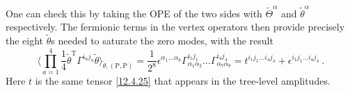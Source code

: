\noindent One can check this by taking the OPE of the two sides with $\tilde{\Theta}^\alpha$ and $\tilde{\theta}^\alpha$ respectively. The fermionic terms in the vertex operators then provide precisely the eight $\tilde{\theta}$s needed to saturate the zero modes, with the result
\begin{equation}
	\biggl\langle \prod_{a=1}^{4}\frac{1}{4}\tilde{\theta}^{\mathrm{T}}\Gamma^{i_a j_a}\tilde{\theta}\biggr\rangle_{\tilde{\theta},(\mathrm{P},\mathrm{P})} = \frac{1}{2^8}\epsilon^{\alpha_1\dots\alpha_8}\Gamma^{i_1 j_1}_{\alpha_1\alpha_2}\dots\Gamma^{i_4 j_4}_{\alpha_7\alpha_8} = t^{i_1 j_1\dots i_4 j_4} + \epsilon^{i_1 j_1\dots i_4 j_4} \:. \label{12.6.29}
\end{equation}
Here $t$ is the same tensor \eqref{12.4.25} that appears in the tree-level amplitudes.

